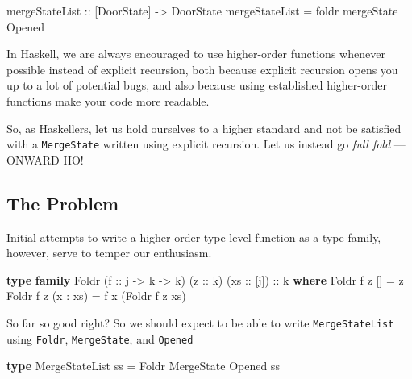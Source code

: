 \documentclass[]{article}
\newenvironment{Shaded}{}{}
\newcommand{\DataTypeTok}[1]{\textcolor[rgb]{0.56,0.13,0.00}{#1}}
\newcommand{\FunctionTok}[1]{\textcolor[rgb]{0.02,0.16,0.49}{#1}}
\newcommand{\KeywordTok}[1]{\textcolor[rgb]{0.00,0.44,0.13}{\textbf{#1}}}
\newcommand{\NormalTok}[1]{#1}
\newcommand{\OperatorTok}[1]{\textcolor[rgb]{0.40,0.40,0.40}{#1}}
\newcommand{\OtherTok}[1]{\textcolor[rgb]{0.00,0.44,0.13}{#1}}
\begin{document}
\begin{Shaded}
\begin{Highlighting}[]
\OtherTok{mergeStateList ::}\NormalTok{ [}\DataTypeTok{DoorState}\NormalTok{] }\OtherTok{{-}>} \DataTypeTok{DoorState}
\NormalTok{mergeStateList }\OtherTok{=} \FunctionTok{foldr}\NormalTok{ mergeState }\DataTypeTok{Opened}
\end{Highlighting}
\end{Shaded}

In Haskell, we are always encouraged to use higher-order functions whenever
possible instead of explicit recursion, both because explicit recursion opens
you up to a lot of potential bugs, and also because using established
higher-order functions make your code more readable.

So, as Haskellers, let us hold ourselves to a higher standard and not be
satisfied with a \texttt{MergeState} written using explicit recursion. Let us
instead go \emph{full fold} --- ONWARD HO!

\hypertarget{the-problem}{%
\subsection{The Problem}\label{the-problem}}

Initial attempts to write a higher-order type-level function as a type family,
however, serve to temper our enthusiasm.

\begin{Shaded}
\begin{Highlighting}[]
\KeywordTok{type} \KeywordTok{family} \DataTypeTok{Foldr}\NormalTok{ (}\OtherTok{f ::}\NormalTok{ j }\OtherTok{{-}>}\NormalTok{ k }\OtherTok{{-}>}\NormalTok{ k) (}\OtherTok{z ::}\NormalTok{ k) (}\OtherTok{xs ::}\NormalTok{ [j])}\OtherTok{ ::}\NormalTok{ k }\KeywordTok{where}
    \DataTypeTok{Foldr}\NormalTok{ f z \textquotesingle{}[]       }\OtherTok{=}\NormalTok{ z}
    \DataTypeTok{Foldr}\NormalTok{ f z (x \textquotesingle{}}\OperatorTok{:}\NormalTok{ xs) }\OtherTok{=}\NormalTok{ f x (}\DataTypeTok{Foldr}\NormalTok{ f z xs)}
\end{Highlighting}
\end{Shaded}

So far so good right? So we should expect to be able to write
\texttt{MergeStateList} using \texttt{Foldr}, \texttt{MergeState}, and
\texttt{\textquotesingle{}Opened}

\begin{Shaded}
\begin{Highlighting}[]
\KeywordTok{type} \DataTypeTok{MergeStateList}\NormalTok{ ss }\OtherTok{=} \DataTypeTok{Foldr} \DataTypeTok{MergeState} \DataTypeTok{\textquotesingle{}Opened}\NormalTok{ ss}
\end{Highlighting}
\end{Shaded}
\end{document}
